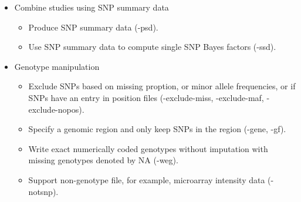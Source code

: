 \documentclass[11pt,Palatino]{article}
\def\tcb{\textcolor{blue}}
\begin{document}
\begin{itemize}
\item {\sc Combine studies using SNP summary data}
\begin{itemize}
\itemsep -0.02in
\item Produce SNP summary data (-psd).
\item Use SNP summary data to compute single SNP Bayes factors (-ssd).
\end{itemize}

\item {\sc Genotype manipulation}
\begin{itemize}
\itemsep -0.02in
\item Exclude SNPs based on missing proption, or minor allele frequencies, or if SNPs have an entry in position files (-exclude-miss, -exclude-maf, -exclude-nopos).
\item Specify a genomic region and only keep SNPs in the region (-gene, -gf).
\item Write exact numerically coded genotypes without imputation with missing genotypes denoted by NA (-weg).
\item Support non-genotype file, for example, microarray intensity data (-notsnp).
\end{itemize}
\end{itemize}

\end{document}
